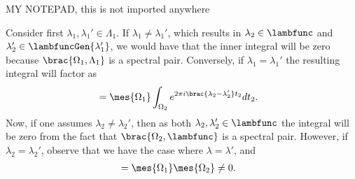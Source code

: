 


MY NOTEPAD, this is not imported anywhere



Consider first $\lambda_1, \lambda_1' \in \Lambda_1$. If $\lambda_1 \neq \lambda_1'$, which results in $\lambda_2\in \lambfunc$ and $\lambda_2'\in \lambfuncGen{\lambda_1'}$, we would have that the inner integral will be zero because $\brac{\Omega_1, \Lambda_1}$ is a spectral pair. Conversely, if $\lambda_1 = \lambda_1'$ the resulting integral will factor as %
\begin{align*}
    &= \mes{\Omega_1} \int_{\Omega_2} e^{2\pi i  \brac{\lambda_2- \lambda_2'}t_2} dt_2.
\end{align*}
Now, if one assumes $\lambda_2 \neq \lambda_2'$, then as both $\lambda_2, \lambda_2' \in \lambfunc$ the integral will be zero from the fact that $\brac{\Omega_2, \lambfunc}$ is a spectral pair. However, if $\lambda_2 = \lambda_2'$, observe that we have the case where $\lambda = \lambda'$, and
\begin{align*}
    &= \mes{\Omega_1}\mes{\Omega_2} \neq 0.
\end{align*}



